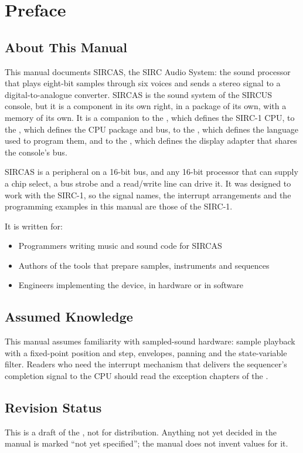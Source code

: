 \chapter*{Preface}
\label{ch:preface}

\section*{About This Manual}

This manual documents SIRCAS, the SIRC Audio System: the sound processor that plays eight-bit samples through six
voices and sends a stereo signal to a digital-to-analogue converter. SIRCAS is the sound system of the SIRCUS console,
but it is a component in its own right, in a package of its own, with a memory of its own. It is a companion to the
\archmanual{}, which defines the SIRC-1 CPU, to the \hwmanual{}, which defines the CPU package and bus, to the
\asmmanual{}, which defines the language used to program them, and to the \videomanual{}, which defines the display
adapter that shares the console's bus.

SIRCAS is a peripheral on a 16-bit bus, and any 16-bit processor that can supply a chip select, a bus strobe and a
read/write line can drive it. It was designed to work with the SIRC-1, so the signal names, the interrupt arrangements
and the programming examples in this manual are those of the SIRC-1.

It is written for:

\begin{itemize}
	\item Programmers writing music and sound code for SIRCAS
	\item Authors of the tools that prepare samples, instruments and sequences
	\item Engineers implementing the device, in hardware or in software
\end{itemize}

\section*{Assumed Knowledge}

This manual assumes familiarity with sampled-sound hardware: sample playback with a fixed-point position and step,
envelopes, panning and the state-variable filter. Readers who need the interrupt mechanism that delivers the
sequencer's completion signal to the CPU should read the exception chapters of the \archmanual{}.

\section*{Revision Status}

This is a draft of the \audiomanual{}, not for distribution. Anything not yet decided in the manual is marked ``not yet
specified''; the manual does not invent values for it.
